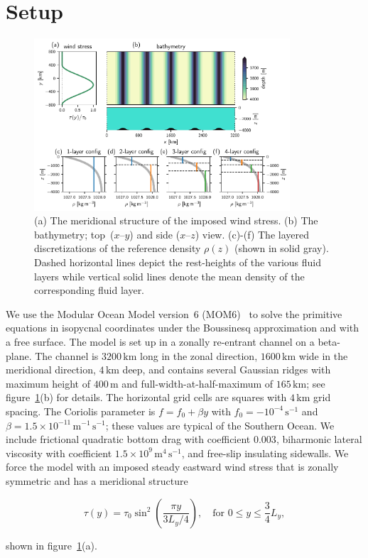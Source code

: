 \documentclass{agujournal2019}
\begin{document}
\section{Setup}

\begin{figure}[t]
\centering
\noindent\includegraphics[width=0.85\textwidth]{domaindensities/domaindensities}
\vspace*{-1em}\caption{(a) The meridional structure of the imposed wind stress. (b) The bathymetry; top~($x$--$y$) and side ($x$--$z$) view. (c)-(f) The layered discretizations of the reference density $\rho(z)$ (shown in solid gray). Dashed horizontal lines depict the rest-heights of the various fluid layers while vertical solid lines denote the mean density of the corresponding fluid layer.}\label{fig:domain}\vspace*{-4em}
\end{figure}


We use the Modular Ocean Model version~6 (MOM6)~\cite{Adcroft-etal-2019-mom6} to solve the primitive equations in isopycnal coordinates under the Boussinesq approximation and with a free surface. The model is set up in a zonally re-entrant channel on a beta-plane. The channel is $3200\,\mathrm{km}$ long in the zonal direction, $1600\,\mathrm{km}$ wide in the meridional direction, $4\,\mathrm{km}$ deep, and contains several Gaussian ridges with maximum height of $400\,\mathrm{m}$ and full-width-at-half-maximum of $165\,\mathrm{km}$; see figure~\ref{fig:domain}(b) for details. The horizontal grid cells are squares with $4\,\mathrm{km}$ grid spacing. The Coriolis parameter is $f=f_0+\beta y$ with $f_0=-10^{-4}\,\mathrm{s}^{-1}$ and $\beta=1.5\times 10^{-11}\,\mathrm{m}^{-1}\,\mathrm{s}^{-1}$; these values are typical of the Southern Ocean. We include frictional quadratic bottom drag {\color{black}with coefficient 0.003}, biharmonic lateral viscosity {\color{black}with coefficient $1.5\times10^9\,\mathrm{m}^4\,\mathrm{s}^{-1}$}, and free-slip {\color{black}insulating} sidewalls. We force the model with an imposed steady eastward wind stress that is zonally symmetric and has a meridional structure 
\begin{linenomath*}
\begin{equation}
    \tau(y) = \tau_0 \sin^2 \left(\frac{\pi y}{3L_y/4}\right),\quad\text{for } 0\le y\le \frac{3}{4}L_y, \label{eq:windstress}
\end{equation} 
\end{linenomath*}
shown in figure~\ref{fig:domain}(a). 
\end{document}
